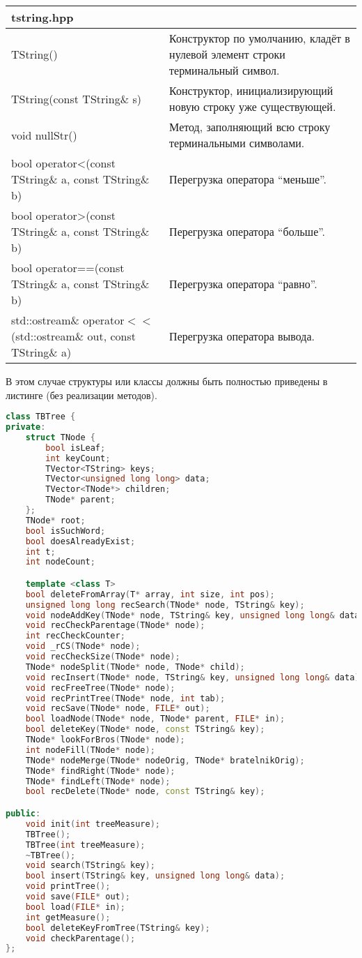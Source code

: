 \begin{longtable}{|p{7.5cm}|p{7.5cm}|}
\hline
\rowcolor{lightgray}
\multicolumn{2}{|c|} {tstring.hpp}\\
\hline
{\ttfamily TString()}&Конструктор по умолчанию, кладёт в нулевой элемент строки терминальный символ.\\
\hline
{\ttfamily TString(const TString\& s)}&Конструктор, инициализирующий новую строку уже существующей.\\
\hline
{\ttfamily void nullStr()}&Метод, заполняющий всю строку терминальными символами.\\
\hline
{\ttfamily bool operator<(const TString\& a, const TString\& b)}&Перегрузка оператора \enquote{меньше}.\\
\hline
{\ttfamily bool operator>(const TString\& a, const TString\& b)}&Перегрузка оператора \enquote{больше}.\\
\hline
{\ttfamily bool operator==(const TString\& a, const TString\& b)}&Перегрузка оператора \enquote{равно}.\\
\hline
{\ttfamily std::ostream\& operator$<<$(std::ostream\& out, const TString\& a)}&Перегрузка оператора вывода.\\
\hline
\end{longtable}

В этом случае структуры или классы должны быть полностью приведены в листинге (без реализации методов).
\begin{lstlisting}[language=C++]
class TBTree {
private:
	struct TNode {
		bool isLeaf;
		int keyCount;
		TVector<TString> keys;
		TVector<unsigned long long> data;
		TVector<TNode*> children;
		TNode* parent;
	};
	TNode* root;
	bool isSuchWord;
	bool doesAlreadyExist;
	int t;
	int nodeCount;

	template <class T>
	bool deleteFromArray(T* array, int size, int pos);
	unsigned long long recSearch(TNode* node, TString& key);
	void nodeAddKey(TNode* node, TString& key, unsigned long long& data);
	void recCheckParentage(TNode* node);
	int recCheckCounter;
	void _rCS(TNode* node);
	void recCheckSize(TNode* node);
	TNode* nodeSplit(TNode* node, TNode* child);
	void recInsert(TNode* node, TString& key, unsigned long long& data);
	void recFreeTree(TNode* node);
	void recPrintTree(TNode* node, int tab);
	void recSave(TNode* node, FILE* out);
	bool loadNode(TNode* node, TNode* parent, FILE* in);
	bool deleteKey(TNode* node, const TString& key);
	TNode* lookForBros(TNode* node);
	int nodeFill(TNode* node);
	TNode* nodeMerge(TNode* nodeOrig, TNode* bratelnikOrig);
	TNode* findRight(TNode* node);
	TNode* findLeft(TNode* node);
	bool recDelete(TNode* node, const TString& key);

public:
	void init(int treeMeasure);
	TBTree();
	TBTree(int treeMeasure);
	~TBTree();
	void search(TString& key);
	bool insert(TString& key, unsigned long long& data);
	void printTree();
	void save(FILE* out);
	bool load(FILE* in);
	int getMeasure();
	bool deleteKeyFromTree(TString& key);
	void checkParentage();
};
\end{lstlisting}

